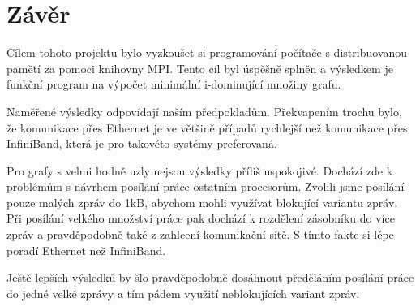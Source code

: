 \documentclass[12pt]{article}
\begin{document}
\section{Závěr}
Cílem tohoto projektu bylo vyzkoušet si programování počítače s distribuovanou pamětí za pomoci knihovny MPI. Tento cíl byl úspěšně splněn a výsledkem je funkční program na výpočet minimální i-dominující množiny grafu.

Naměřené výsledky odpovídají naším předpokladům. Překvapením trochu bylo, že komunikace přes Ethernet je ve většině případů rychlejší než komunikace přes InfiniBand, která je pro takovéto systémy preferovaná.

Pro grafy s velmi hodně uzly nejsou výsledky příliš uspokojivé. Dochází zde k problémům s návrhem posílání práce ostatním procesorům. Zvolili jsme posílání pouze malých zpráv do 1kB, abychom mohli využívat blokující variantu zpráv. Při posílání velkého množství práce pak dochází k rozdělení zásobníku do více zpráv a pravděpodobně také z zahlcení komunikační sítě. S tímto fakte si lépe poradí Ethernet než InfiniBand.

Ještě lepších výsledků by šlo pravděpodobně dosáhnout předěláním posílání práce do jedné velké zprávy a tím pádem využití neblokujících variant zpráv.   
\end{document}

